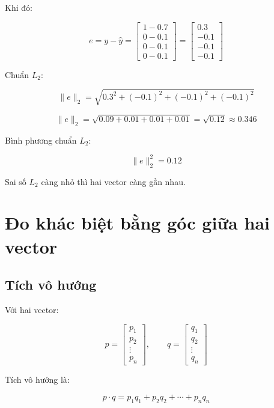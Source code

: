 Khi đó:

\[
    e = y-\hat{y}
    =
    \begin{bmatrix}
    1-0.7\\
    0-0.1\\
    0-0.1\\
    0-0.1
    \end{bmatrix}
    =
    \begin{bmatrix}
    0.3\\
    -0.1\\
    -0.1\\
    -0.1
    \end{bmatrix}
\]

Chuẩn $L_2$:

\[
    \|e\|_2
    =
    \sqrt{0.3^2+(-0.1)^2+(-0.1)^2+(-0.1)^2}
\]

\[
    \|e\|_2
    =
    \sqrt{0.09+0.01+0.01+0.01}
    =
    \sqrt{0.12}
    \approx 0.346
\]

Bình phương chuẩn $L_2$:

\[
    \|e\|_2^2 = 0.12
\]

\begin{ghinho}
Sai số $L_2$ càng nhỏ thì hai vector càng gần nhau.
\end{ghinho}

\section{Đo khác biệt bằng góc giữa hai vector}

\subsection{Tích vô hướng}

Với hai vector:

\[
    p =
    \begin{bmatrix}
    p_1\\p_2\\ \vdots\\p_n
    \end{bmatrix},
    \qquad
    q =
    \begin{bmatrix}
    q_1\\q_2\\ \vdots\\q_n
    \end{bmatrix}
\]

Tích vô hướng là:

\[
    p \cdot q = p_1q_1+p_2q_2+\cdots+p_nq_n
\]

